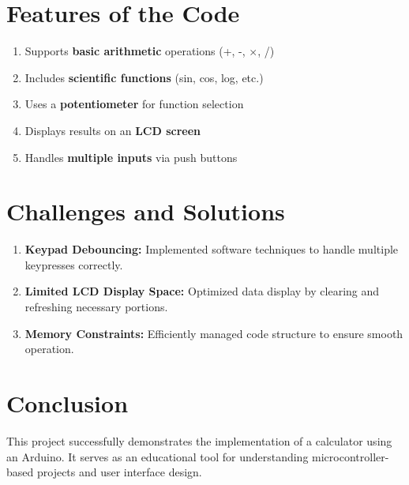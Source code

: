 \documentclass[journal,12pt,onecolumn,article]{IEEEtran}
\theoremstyle{remark}
\begin{document}
\section{Features of the Code}
\begin{enumerate}
    \item Supports \textbf{basic arithmetic} operations (+, -, $\times$, /)
    \item Includes \textbf{scientific functions} (sin, cos, log, etc.)
    \item Uses a \textbf{potentiometer} for function selection
    \item Displays results on an \textbf{LCD screen}
    \item Handles \textbf{multiple inputs} via push buttons
\end{enumerate}
\section{Challenges and Solutions}
\begin{enumerate}
    \item \textbf{Keypad Debouncing:} Implemented software techniques to handle multiple keypresses correctly.
    \item \textbf{Limited LCD Display Space:} Optimized data display by clearing and refreshing necessary portions.
    \item \textbf{Memory Constraints:} Efficiently managed code structure to ensure smooth operation.
\end{enumerate}

\section{Conclusion}
This project successfully demonstrates the implementation of a calculator using an Arduino. It serves as an educational tool for understanding microcontroller-based projects and user interface design.
\end{document}
